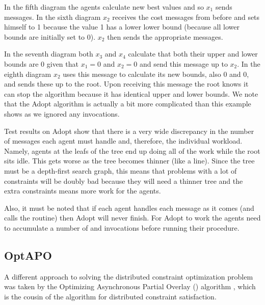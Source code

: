 In the fifth diagram the agents calculate new best values and so $x_1$
sends  messages. In the sixth diagram $x_2$
receives the cost messages from before and sets himself to 1 because
the value 1 has a lower lower bound (because all lower bounds are
initially set to 0). $x_2$ then sends the appropriate
 messages.

In the seventh diagram both $x_3$ and $x_4$ calculate that both their
upper and lower bounds are 0 given that $x_1=0$ and $x_2=0$ and send
this message up to $x_2$. In the eighth diagram $x_2$ uses this
message to calculate its new bounds, also 0 and 0, and sends these up
to the root. Upon receiving this message the root knows it can stop
the algorithm because it has identical upper and lower bounds. We note
that the Adopt algorithm is actually a bit more complicated than this
example shows as we ignored any  invocations.

Test results on Adopt show that there is a very wide discrepancy in
the number of messages each agent must handle and, therefore, the
individual workload.  Namely, agents at the leafs of the tree end up
doing all of the work while the root sits idle. This gets worse as the
tree becomes thinner (like a line). Since the tree must be a
depth-first search graph, this means that problems with a lot of
constraints will be doubly bad because they will need a thinner tree
and the extra constraints means more work for the agents.

Also, it must be noted that if each agent handles each message as it
comes (and calls the  routine) then Adopt will never
finish. For Adopt to work the agents need to accumulate a number of
 and  invocations before running
their  procedure.

\subsection{OptAPO}
\newcommand{\optapo}{opt\acro{apo}}

A different approach to solving the distributed constraint
optimization problem was taken by the Optimizing Asynchronous Partial
Overlay (\tdi{\optapo}{optAPO}) algorithm \cite{mailler04b}, which is the
cousin of the  algorithm \cite{mailler04a} for
distributed constraint satisfaction.

